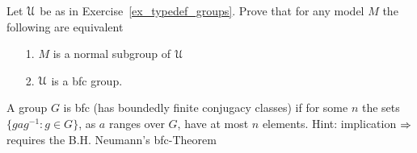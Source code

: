 \begin{exercise}\label{ex_bfc_groups}
  Let $\EuScript U$ be as in Exercise~\ref{ex_typedef_groups}.
  Prove that for any model $M$ the following are equivalent
  \begin{itemize}
    \item[1.] $M$ is a normal subgroup of $\EuScript U$
    \item[2.] $\EuScript U$ is a {\sc bfc} group.
  \end{itemize}
  A group $G$ is {\sc bfc} (has boundedly finite conjugacy classes) if for some $n$ the sets $\{gag^{-1}:g\in G\}$, as $a$ ranges over $G$, have at most $n$ elements. Hint: implication $\Rightarrow$ requires the B.H. Neumann's {\sc bfc}-Theorem
\end{exercise}